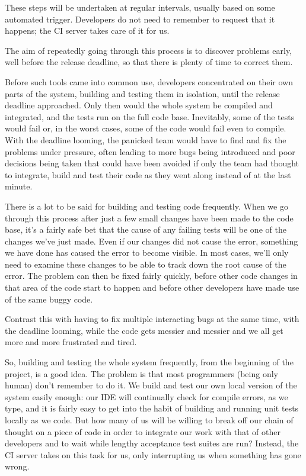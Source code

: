 \documentclass[
]{book}
\begin{document}
These steps will be undertaken at regular intervals, usually based on some automated trigger. Developers do not need to remember to request that it happens; the CI server takes care of it for us.

The aim of repeatedly going through this process is to discover problems early, well before the release deadline, so that there is plenty of time to correct them.

Before such tools came into common use, developers concentrated on their own parts of the system, building and testing them in isolation, until the release deadline approached. Only then would the whole system be compiled and integrated, and the tests run on the full code base. Inevitably, some of the tests would fail or, in the worst cases, some of the code would fail even to compile. With the deadline looming, the panicked team would have to find and fix the problems under pressure, often leading to more bugs being introduced and poor decisions being taken that could have been avoided if only the team had thought to integrate, build and test their code as they went along instead of at the last minute.

There is a lot to be said for building and testing code frequently. When we go through this process after just a few small changes have been made to the code base, it's a fairly safe bet that the cause of any failing tests will be one of the changes we've just made. Even if our changes did not cause the error, something we have done has caused the error to become visible. In most cases, we'll only need to examine these changes to be able to track down the root cause of the error. The problem can then be fixed fairly quickly, before other code changes in that area of the code start to happen and before other developers have made use of the same buggy code.

Contrast this with having to fix multiple interacting bugs at the same time, with the deadline looming, while the code gets messier and messier and we all get more and more frustrated and tired.

So, building and testing the whole system frequently, from the beginning of the project, is a good idea. The problem is that most programmers (being only human) don't remember to do it. We build and test our own local version of the system easily enough: our IDE will continually check for compile errors, as we type, and it is fairly easy to get into the habit of building and running unit tests locally as we code. But how many of us will be willing to break off our chain of thought on a piece of code in order to integrate our work with that of other developers and to wait while lengthy acceptance test suites are run? Instead, the CI server takes on this task for us, only interrupting us when something has gone wrong.
\end{document}
